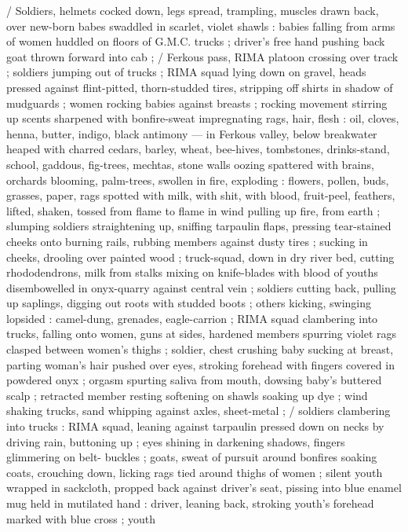 
/ Soldiers, helmets cocked down, legs spread, trampling, muscles
drawn back, over new-born babes swaddled in scarlet, violet shawls
: babies falling from arms of women huddled on floors of G.M.C.
trucks ; driver's free hand pushing back goat thrown forward into cab
; / Ferkous pass, RIMA platoon crossing over track ; soldiers jumping
out of trucks ; RIMA squad lying down on gravel, heads pressed
against flint-pitted, thorn-studded tires, stripping off shirts in
shadow of mudguards ; women rocking babies against breasts ;
rocking movement stirring up scents sharpened with bonfire-sweat
impregnating rags, hair, flesh : oil, cloves, henna, butter, indigo,
black antimony --- in Ferkous valley, below breakwater heaped with
charred cedars, barley, wheat, bee-hives, tombstones, drinks-stand,
school, gaddous, fig-trees, mechtas, stone walls oozing spattered
with brains, orchards blooming, palm-trees, swollen in fire, exploding
: flowers, pollen, buds, grasses, paper, rags spotted with milk, with
shit, with blood, fruit-peel, feathers, lifted, shaken, tossed from
flame to flame in wind pulling up fire, from earth ; slumping soldiers
straightening up, sniffing tarpaulin flaps, pressing tear-stained
cheeks onto burning rails, rubbing members against dusty tires ;
sucking in cheeks, drooling over painted wood ; truck-squad, down
in dry river bed, cutting rhododendrons, milk from stalks mixing on
knife-blades with blood of youths disembowelled in onyx-quarry
against central vein ; soldiers cutting back, pulling up saplings,
digging out roots with studded boots ; others kicking, swinging
lopsided : camel-dung, grenades, eagle-carrion ; RIMA squad
clambering into trucks, falling onto women, guns at sides, hardened
members spurring violet rags clasped between women's thighs ; %
soldier, chest crushing baby sucking at breast, parting woman's hair
pushed over eyes, stroking forehead with fingers covered in
powdered onyx ; orgasm spurting saliva from mouth, dowsing baby's
buttered scalp ; retracted member resting softening on shawls
soaking up dye ; wind shaking trucks, sand whipping against axles,
sheet-metal ; / soldiers clambering into trucks : RIMA squad, leaning
against tarpaulin pressed down on necks by driving rain, buttoning
up ; eyes shining in darkening shadows, fingers glimmering on belt-
buckles ; goats, sweat of pursuit around bonfires soaking coats,
crouching down, licking rags tied around thighs of women ; silent
youth wrapped in sackcloth, propped back against driver's seat,
pissing into blue enamel mug held in mutilated hand : driver, leaning
back, stroking youth's forehead marked with blue cross ; youth
